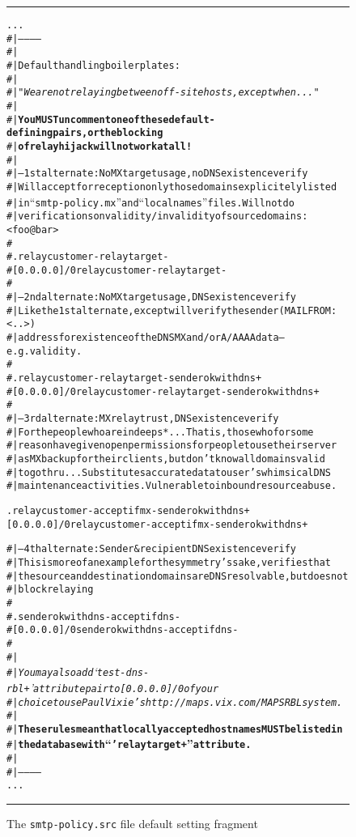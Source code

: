 \begin{figure*}[ht]
\begin{alltt}\medskip\hrule\medskip\setlength{\baselineskip}{0.8\baselineskip}
...
#|-----------
#|
#| {\rm Default handling boilerplates:}
#|
#|   {\em "We are not relaying between off-site hosts, except when ..."}
#|
#| {\bf You MUST uncomment one of these default-defining pairs, or the blocking}
#| {\bf of relay hijack will not work at all !}
#|
#| {\rm -- 1st alternate: No MX target usage, no DNS existence verify}
#|    {\rm Will accept for reception only those domains explicitely listed}
#|    {\rm in ``smtp-policy.mx'' and  ``localnames''  files.  Will not do}
#|    {\rm verifications on validity/invalidity of source domains:}<foo@bar>
#
# .             relaycustomer - relaytarget -
# [0.0.0.0]/0   relaycustomer - relaytarget -
#
#| {\rm -- 2nd alternate: No MX target usage, DNS existence verify}
#|    {\rm Like the 1st alternate, except will verify the sender} (MAIL FROM:<..>)
#|    {\rm address for existence of the DNS MX and/or A/AAAA data -- e.g. validity.}
#
# .             relaycustomer - relaytarget - senderokwithdns +
# [0.0.0.0]/0   relaycustomer - relaytarget - senderokwithdns +
#
#| {\rm -- 3rd alternate: MX relay trust, DNS existence verify}
#|    {\rm For the people who are in deep s*...  That is, those who for some}
#|    {\rm reason have given open permissions for people to use their server}
#|    {\rm as MX backup for their clients, but don't know all domains valid}
#|    {\rm to go thru...  Substitutes accurate data to user's whimsical DNS}
#|    {\rm maintenance activities.  Vulnerable to inbound resource abuse.}

.               relaycustomer - acceptifmx - senderokwithdns +
[0.0.0.0]/0     relaycustomer - acceptifmx - senderokwithdns +

#| {\rm -- 4th alternate: Sender & recipient DNS existence verify}
#|    {\rm This is more of an example for the symmetry's sake, verifies that}
#|    {\rm the source and destination domains are DNS resolvable, but does not}
#|    {\rm block relaying}
#
# .             senderokwithdns - acceptifdns -
# [0.0.0.0]/0   senderokwithdns - acceptifdns -
#
#|
#|  {\em You may also add  `test-dns-rbl +'  attribute pair to [0.0.0.0]/0 of your}
#|  {\em choice to use Paul Vixie's  http://maps.vix.com/ MAPS RBL system.}
#|
#| {\bf These rules mean that locally accepted hostnames MUST be listed in}
#| {\bf the database with ``'relaytarget +'' attribute.}
#|
#|-----------
...
\medskip\hrule\end{alltt}\medskip
\caption{\label{fig:adm:smtp-policy-boiler}
The {\tt smtp-policy.src} file default setting fragment}
\end{figure*}
